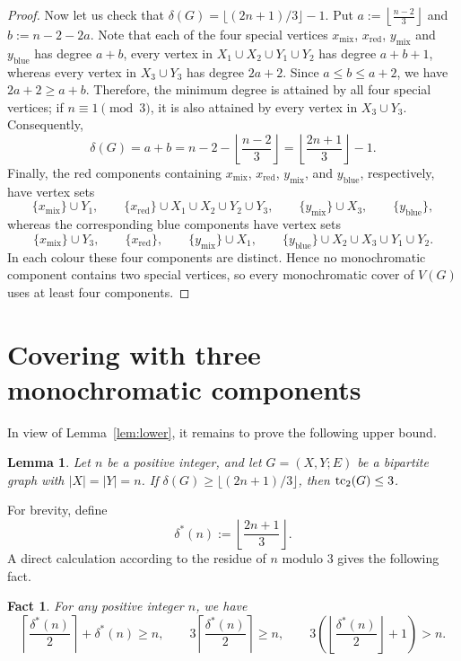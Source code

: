 \documentclass[12pt,reqno,a4paper]{amsart}
\newtheorem{lemma}     [theorem] {Lemma}
\newtheorem{fact}     [theorem] {Fact}
\def\tc{\mathop{\text{\rm tc}}\nolimits}
\newcommand{\blue}{\mathrm{blue}}
\newcommand{\red}{\mathrm{red}}
\newcommand{\mix}{\mathrm{mix}}
\begin{document}
\begin{proof}
Now let us check that $\delta(G) = \lfloor (2n+1)/3 \rfloor - 1$. Put
$a:=\left\lfloor\frac{n-2}{3}\right\rfloor$ and $b:=n-2-2a$. Note that each of
the four special vertices $x_{\mix}$, $x_{\red}$, $y_{\mix}$ and $y_{\blue}$ has
degree $a+b$, every vertex in $X_1\cup X_2\cup Y_1\cup Y_2$ has degree $a+b+1$,
whereas every vertex in $X_3\cup Y_3$ has degree $2a+2$. Since $a\leq b \leq
a+2$, we have $2a+2\geq a+b$. Therefore, the minimum degree is attained by all
four special vertices; if $n\equiv1\pmod 3$, it is also attained by every
vertex in $X_3\cup Y_3$. Consequently,
\[
\delta(G)=a+b
=n-2-\left\lfloor\frac{n-2}{3}\right\rfloor
=\left\lfloor\frac{2n+1}{3}\right\rfloor-1.
\]
Finally, the red components containing $x_{\mix}$, $x_{\red}$, $y_{\mix}$,
and $y_{\blue}$, respectively, have vertex sets
\[
\{x_{\mix}\}\cup Y_1,\qquad
\{x_{\red}\}\cup X_1\cup X_2\cup Y_2\cup Y_3,\qquad
\{y_{\mix}\}\cup X_3,\qquad
\{y_{\blue}\},
\]
whereas the corresponding blue components have vertex sets
\[
\{x_{\mix}\}\cup Y_3,\qquad
\{x_{\red}\},\qquad
\{y_{\mix}\}\cup X_1,\qquad
\{y_{\blue}\}\cup X_2\cup X_3\cup Y_1\cup Y_2.
\]
In each colour these four components are distinct. Hence no monochromatic
component contains two special vertices, so every monochromatic cover of
$V(G)$ uses at least four components.
\end{proof}

\section{Covering with three monochromatic components}

In view of Lemma~\ref{lem:lower}, it remains to prove the following upper bound.

\begin{lemma}\label{lem:upper_bound}
Let $n$ be a positive integer, and let $G=(X,Y;E)$ be a bipartite graph with
$|X|=|Y|=n$. If $\delta(G)\ge \lfloor(2n+1)/3\rfloor$, then $\tc_2(G)\le 3$.
\end{lemma}
For brevity, define
\[
\delta^*(n):=\left\lfloor\frac{2n+1}{3}\right\rfloor.
\]
A direct calculation according to the residue of $n$ modulo $3$ gives the
following fact.
\begin{fact}\label{fact:simple}
For any positive integer $n$, we have 
\[
\left\lceil\frac{\delta^*(n)}{2}\right\rceil+\delta^*(n)\ge n,
\qquad
3\left\lceil\frac{\delta^*(n)}{2}\right\rceil\ge n,
\qquad
3\left(\left\lfloor\frac{\delta^*(n)}{2}\right\rfloor+1\right)>n.
\]
\end{fact}
\end{document}
